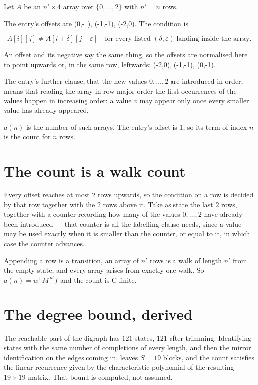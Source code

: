 \documentclass[11pt]{article}
\theoremstyle{definition}
\begin{document}
Let $A$ be an $n' \times 4$ array over $\{0,\dots,2\}$ with $n' = n$ rows.

The entry's offsets are (0,-1), (-1,-1), (-2,0). The condition is

\[A[i][j] \ne A[i{+}\delta][j{+}\varepsilon]\quad\text{for every listed }(\delta,\varepsilon)\text{ landing inside the array.}\]

An offset and its negative say the same thing, so the offsets are normalised here to point upwards or, in the same row, leftwards: (-2,0), (-1,-1), (0,-1).

The entry's further clause, that the new values $0,\dots,2$ are introduced in order, means that reading the array in row-major order the first occurrences of the values happen in increasing order: a value $v$ may appear only once every smaller value has already appeared.

$a(n)$ is the number of such arrays. The entry's offset is 1, so its term of index $n$ is the count for $n$ rows.

\section{The count is a walk count}

Every offset reaches at most $2$ rows upwards, so the condition on a row is decided by that row together with the $2$ rows above it. Take as state the last $2$ rows, together with a counter recording how many of the values $0,\dots,2$ have already been introduced --- that counter is all the labelling clause needs, since a value may be used exactly when it is smaller than the counter, or equal to it, in which case the counter advances.

Appending a row is a transition, an array of $n'$ rows is a walk of length $n'$ from the empty state, and every array arises from exactly one walk. So $a(n) = w^{\mathsf T}M^{\,n'}f$ and the count is C-finite.

\section{The degree bound, derived}

The reachable part of the digraph has $121$ states, $121$ after trimming. Identifying states with the same number of completions of every length, and then the mirror identification on the edges coming in, leaves $S = 19$ blocks, and the count satisfies the linear recurrence given by the characteristic polynomial of the resulting $19\times19$ matrix. That bound is computed, not assumed.
\end{document}
